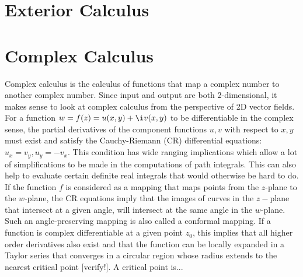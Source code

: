 \documentclass[12pt]{book}  %
\begin{document}

\section{Exterior Calculus} 
 




\section{Complex Calculus}
Complex calculus is the calculus of functions that map a complex number to another complex number. Since input and output are both 2-dimensional, it makes sense to look at complex calculus from the perspective of 2D vector fields. For a function $w = f(z) = u(x,y) + \i v(x,y)$ to be differentiable in the complex sense, the partial derivatives of the component functions $u,v$ with respect to $x,y$ must exist and satisfy the Cauchy-Riemann (CR) differential equations: $u_x = v_y, u_y = -v_x$. This condition has wide ranging implications which allow a lot of simplifications to be made in the computations of path integrals. This can also help to evaluate certain definite real integrals that would otherwise be hard to do. If the function $f$ is considered as a mapping that maps points from the $z$-plane to the $w$-plane, the CR equations imply that the images of curves in the $z-$plane that intersect at a given angle, will intersect at the same angle in the $w$-plane. Such an angle-preserving mapping is also called a conformal mapping. If a function is complex differentiable at a given point $z_0$, this implies that all higher order derivatives also exist and that the function can be locally expanded in a Taylor series that converges in a circular region whose radius extends to the nearest critical point [verify!]. A critical point is...
\end{document}
